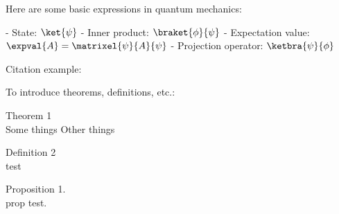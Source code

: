 Here are some basic expressions in quantum mechanics: %

- State: \( \ket{\psi} \)
- Inner product: \( \braket{\phi}{\psi} \)
- Expectation value: \( \expval{A} = \matrixel{\psi}{A}{\psi} \)
- Projection operator: \( \ketbra{\psi}{\phi} \)


Citation example: \autocite{bell1964}


To introduce theorems, definitions, etc.:
\begin{thm}
    Theorem 1\\
    Some things
    Other things
\end{thm}

\begin{defn}
    Definition 2\\
    test\\
\end{defn}

\begin{prop}
    Proposition 1. \\ prop test.
\end{prop}